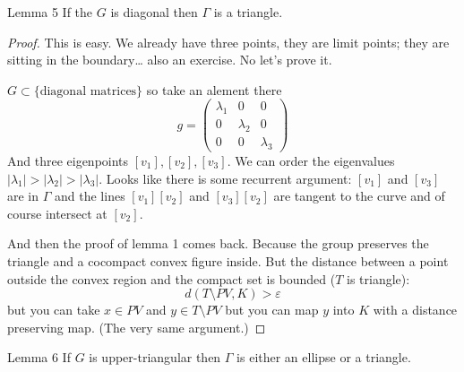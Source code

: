 \begin{thing4}{Lemma 5}\leavevmode
	If the $G$ is diagonal then $\Gamma$ is a triangle.
\end{thing4}

\begin{proof}\leavevmode
	This is easy. We already have three points, they are limit points; they are sitting in the boundary… also an {\color{4}exercise}. No let's prove it.

	$G\subset \{\text{diagonal matrices} \}$ so take an alement there
	\[g=\begin{pmatrix} \lambda_1 & 0 & 0\\ 0 & \lambda_2 & 0\\ 0 & 0 & \lambda_3 \end{pmatrix} \]
	And three eigenpoints $[v_1], [v_2], [v_3]$. We can order the eigenvalues $|\lambda_1|>|\lambda_2|>|\lambda_3|$. Looks like there is some recurrent argument: $[v_1]$ and $[v_3]$ are in $\Gamma$ and the lines $[v_1][v_2]$ and $[v_3][v_2]$ are tangent to the curve and of course intersect at $[v_2]$.

	And then the proof of lemma 1 comes back. Because the group preserves the triangle and a cocompact convex figure inside. But the distance between a point outside the convex region and the compact set is bounded ($T$ is triangle):
	\[d(T\setminus PV,K)>\varepsilon\]
	but you can take $x \in PV$ and $y\in T\setminus PV$ but you can map $y$ into $K$ with a distance preserving map. (The very same argument.)
\end{proof}

\begin{thing1}{Lemma 6}\leavevmode
	If $G$ is upper-triangular then $\Gamma$ is either an ellipse or a triangle.
\end{thing1}

